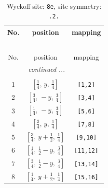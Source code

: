 \documentclass[fleqn,8pt]{jsarticle}
\begin{document}
\begin{longtable}{ccc}
\caption{Wyckoff site: {\tt 8e}, site symmetry: {\tt .2.}}
 \\
 \hline \hline
No. & position & mapping \\ \hline \endfirsthead

\multicolumn{2}{l}{\tablename\ \thetable{}} \\
 \hline \hline
No. & position & mapping \\ \hline \endhead

 \hline \hline
\multicolumn{2}{r}{\footnotesize\it continued ...} \\ \endfoot

 \hline \hline
\multicolumn{2}{r}{} \\ \endlastfoot

1 & $\left[ \frac{1}{4},\, y,\, \frac{1}{4} \right]$ & {\tt [1,2]} \\ \hline
2 & $\left[ \frac{3}{4},\, - y,\, \frac{3}{4} \right]$ & {\tt [3,4]} \\ \hline
3 & $\left[ \frac{1}{4},\, - y,\, \frac{3}{4} \right]$ & {\tt [5,6]} \\ \hline
4 & $\left[ \frac{3}{4},\, y,\, \frac{1}{4} \right]$ & {\tt [7,8]} \\ \hline
5 & $\left[ \frac{3}{4},\, y + \frac{1}{2},\, \frac{1}{4} \right]$ & {\tt [9,10]} \\ \hline
6 & $\left[ \frac{1}{4},\, \frac{1}{2} - y,\, \frac{3}{4} \right]$ & {\tt [11,12]} \\ \hline
7 & $\left[ \frac{3}{4},\, \frac{1}{2} - y,\, \frac{3}{4} \right]$ & {\tt [13,14]} \\ \hline
8 & $\left[ \frac{1}{4},\, y + \frac{1}{2},\, \frac{1}{4} \right]$ & {\tt [15,16]} \\
\end{longtable}
\renewcommand{\arraystretch}{1.2}
\end{document}
